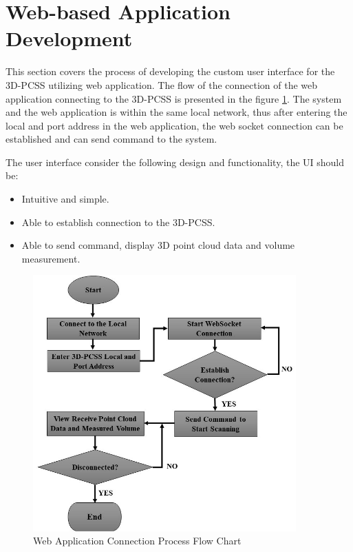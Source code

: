 

\section{Web-based Application Development}
This section covers the process of developing the custom user interface for the 3D-PCSS utilizing web application. The flow of the connection of the web application connecting to the 3D-PCSS is presented in the figure \ref{ch3:fig:web_app_connection}. The system and the web application is within the same local network, thus after entering the local and port address in the web application, the web socket connection can be established and can send command to the system.

The user interface consider the following design and functionality, the UI should be:
\begin{itemize}
	\item Intuitive and simple.
	\item Able to establish connection to the 3D-PCSS.
	\item Able to send command, display 3D point cloud data and volume measurement.
\end{itemize}

\begin{figure}[H]
	\centering
	\includegraphics[width=0.9\textwidth]{Figures/web_app_connection}
	\caption{Web Application Connection Process Flow Chart}
	\label{ch3:fig:web_app_connection}
\end{figure}

